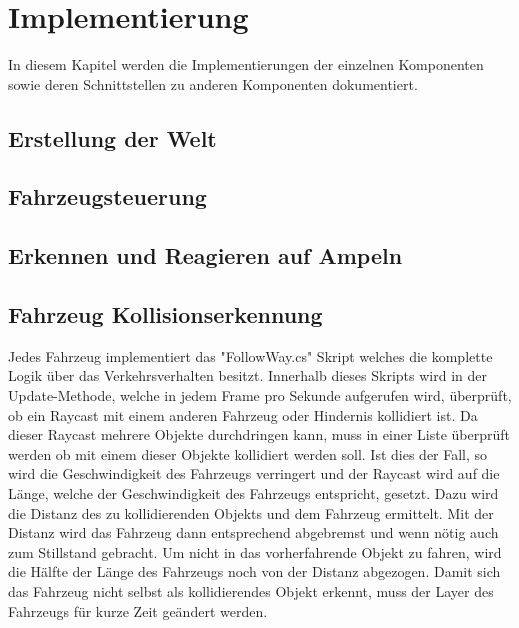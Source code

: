 
\chapter{Implementierung}
\label{Implementierung}

In diesem Kapitel werden die Implementierungen der einzelnen Komponenten sowie deren Schnittstellen zu anderen Komponenten dokumentiert.

\thispagestyle{standard}
\pagestyle{standard}

\section{Erstellung der Welt}
\label{Erstellung_der_Welt}

\section{Fahrzeugsteuerung}
\label{Fahrzeugsteuerung}

\section{Erkennen und Reagieren auf Ampeln}
\label{Erkennen_und_Reagieren_auf_Ampeln}

\section{Fahrzeug Kollisionserkennung}
\label{Fahrzeug_Kollisionserkennung}

Jedes Fahrzeug implementiert das "FollowWay.cs" Skript welches die komplette Logik über das Verkehrsverhalten besitzt. Innerhalb dieses Skripts wird in der Update-Methode, welche in jedem Frame pro Sekunde aufgerufen wird, überprüft, ob ein Raycast mit einem anderen Fahrzeug oder Hindernis kollidiert ist. Da dieser Raycast mehrere Objekte durchdringen kann, muss in einer Liste überprüft werden ob mit einem dieser Objekte kollidiert werden soll. Ist dies der Fall, so wird die Geschwindigkeit des Fahrzeugs verringert und der Raycast wird auf die Länge, welche der Geschwindigkeit des Fahrzeugs entspricht, gesetzt. Dazu wird die Distanz des zu kollidierenden Objekts und dem Fahrzeug ermittelt. Mit der Distanz wird das Fahrzeug dann entsprechend abgebremst und wenn nötig auch zum Stillstand gebracht. Um nicht in das vorherfahrende Objekt zu fahren, wird die Hälfte der Länge des Fahrzeugs noch von der Distanz abgezogen. Damit sich das Fahrzeug nicht selbst als kollidierendes Objekt erkennt, muss der Layer des Fahrzeugs für kurze Zeit geändert werden.

